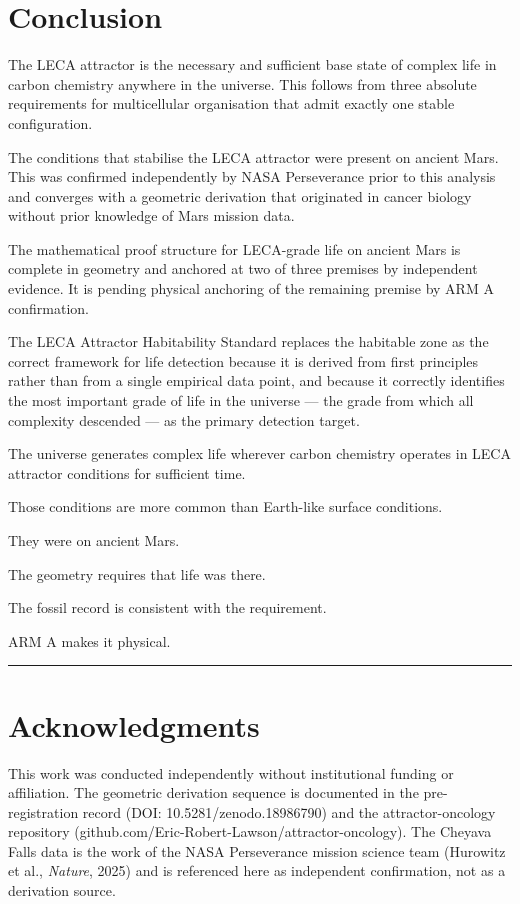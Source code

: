 \documentclass[11pt, a4paper]{article}
\begin{document}
\section{Conclusion}

The LECA attractor is the necessary and sufficient base
state of complex life in carbon chemistry anywhere in
the universe. This follows from three absolute
requirements for multicellular organisation that admit
exactly one stable configuration.

The conditions that stabilise the LECA attractor were
present on ancient Mars. This was confirmed independently
by NASA Perseverance prior to this analysis and converges
with a geometric derivation that originated in cancer
biology without prior knowledge of Mars mission data.

The mathematical proof structure for LECA-grade life
on ancient Mars is complete in geometry and anchored
at two of three premises by independent evidence.
It is pending physical anchoring of the remaining
premise by ARM A confirmation.

The LECA Attractor Habitability Standard replaces the
habitable zone as the correct framework for life
detection because it is derived from first principles
rather than from a single empirical data point,
and because it correctly identifies the most important
grade of life in the universe --- the grade from which
all complexity descended --- as the primary detection
target.

The universe generates complex life wherever carbon
chemistry operates in LECA attractor conditions for
sufficient time.

Those conditions are more common than Earth-like
surface conditions.

They were on ancient Mars.

The geometry requires that life was there.

The fossil record is consistent with the requirement.

ARM A makes it physical.

\vspace{1em}
\noindent\textcolor{rulecolor}{\rule{\linewidth}{0.4pt}}

\section*{Acknowledgments}

This work was conducted independently without
institutional funding or affiliation. The geometric
derivation sequence is documented in the pre-registration
record (DOI: 10.5281/zenodo.18986790) and the
attractor-oncology repository
(github.com/Eric-Robert-Lawson/attractor-oncology).
The Cheyava Falls data is the work of the NASA
Perseverance mission science team (Hurowitz et al.,
\textit{Nature}, 2025) and is referenced here as
independent confirmation, not as a derivation source.
\end{document}
